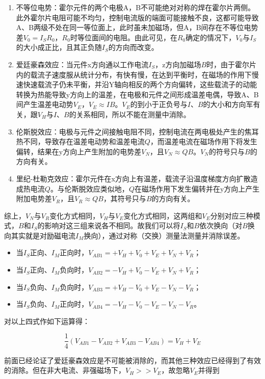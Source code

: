 \documentclass[12pt]{article}
\begin{document}
\begin{enumerate}
    \item 不等位电势：霍尔元件的两个电极A，B不可能绝对对称的焊在霍尔片两侧。此外霍尔片电阻可能不均匀，控制电流版的端面可能接触不良，这都可能导致A、B两级不处在同一等位面上，此时虽未加磁场，但A，B间存在不等位电势差$V_0=I_SR_0$，$R_0$时等位面间的电阻。由此可见，在$R_0$确定的情况下，$V_0$与$I_S$的大小成正比，且其正负随$I_S$的方向而改变。
    \item 爱廷豪森效应：当元件x方向通以工作电流$I_S$，z方向加磁场$B$时，由于霍尔片内的载流子速度服从统计分布，有快有慢，在达到平衡时，在磁场的作用下慢速快速载流子仍未平衡，并沿Y轴向相反的两个方向偏转，这些载流子的动能转换为热能导致y方向上的温差，在电极和元件之间形成温差电偶，导致A、B间产生温差电动势$V_E$，$V_E \approx IB$。$V_E$的到小于正负号与$I$、$B$的大小和方向军有关，跟$V_H$与$I$、$B$的关系相同，所以不能在测量中消除。
    \item 伦斯脱效应：电极与元件之间接触电阻不同，控制电流在两电极处产生的焦耳热不同，导致存在温差电动势和温差电流$Q$，而温差电流在磁场作用下将发生偏转，结果在y方向上产生附加的电势差$V_N$，且$V_N\approx QB$。$V_N$的符号只与$B$的方向有关。
    \item 里纪-杜勒克效应：霍尔元件在x方向上有温差，载流子沿温度梯度方向扩散造成热电流$Q$。与伦斯脱效应类似地，$Q$在磁场作用下发生偏转并在y方向上产生附加电势差$V_R$，且$V_R\approx QB$，其符号只与$B$的方向有关。
\end{enumerate}

综上，$V_N$与$V_R$变化方式相同，$V_H$与$V_E$变化方式相同，这两组和$V_E$分别对应三种模式，$B$和$I_S$的影响对这三组来说各不相同。故我们可以将$I_S$和$B$依次换向（对$B$换向其实就是对励磁电流$I_M$换向），通过对称（交换）测量法测量并消除误差。

\begin{itemize}
    \item 当$I_S$正向、$I_M$正向时，$V_{AB1}=+V_H+V_0+V_E+V_N+V_R$；
    \item 当$I_S$正向、$I_M$负向时，$V_{AB2}=-V_H+V_0-V_E+V_N+V_R$；
    \item 当$I_S$负向、$I_M$负向时，$V_{AB3}=+V_H-V_0+V_E-V_N-V_R$；
    \item 当$I_S$负向、$I_M$正向时，$V_{AB4}=-V_H-V_0-V_E-V_N-V_R$。
\end{itemize}

对以上四式作如下运算得：

\[
    \frac{1}{4}(V_{AB1}-V_{AB2}+V_{AB3}-V_{AB4})=V_H+V_E
\]

前面已经论证了爱廷豪森效应是不可能被消除的，而其他三种效应已经得到了有效的消除。但在非大电流、非强磁场下，$V_H>>V_E$，故忽略$V_E$并得到
\end{document}
